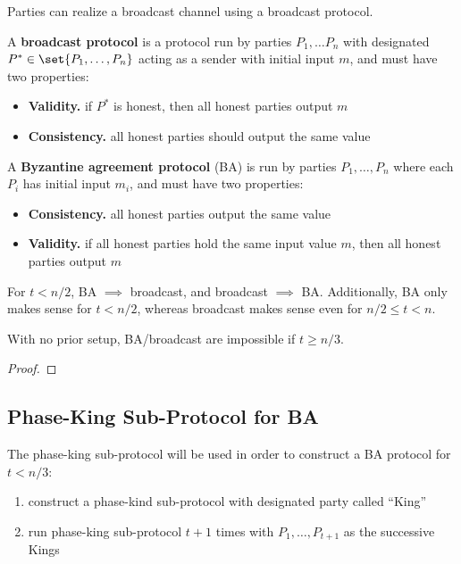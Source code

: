 
Parties can realize a broadcast channel using a broadcast protocol.

\begin{defn}
A \textbf{broadcast protocol} is a protocol run by parties $P_1, \dots  P_n$ with designated $P^* \in \set{P_1, \dots, P_n}$ acting as a sender with initial input $m$, and must have two properties:
\begin{itemize}
\item \textbf{Validity.} if $P^*$ is honest, then all honest parties output $m$
\item \textbf{Consistency.} all honest parties should output the same value
\end{itemize}
\end{defn}

\begin{defn}
A \textbf{Byzantine agreement protocol} (BA) is run by parties $P_1, \dots, P_n$ where each $P_i$ has initial input $m_i$, and must have two properties:
\begin{itemize}
\item \textbf{Consistency.} all honest parties output the same value 
\item \textbf{Validity.} if all honest parties hold the same input value $m$, then all honest parties output $m$
\end{itemize}
\end{defn}

For $t < n/2$, BA $\implies$ broadcast, and broadcast $\implies$ BA.
Additionally, BA only makes sense for $t < n/2$, whereas broadcast makes sense even for $n/2 \leq t < n$.

\begin{lem}
With no prior setup, BA/broadcast are impossible if $t \geq n/3$.
\end{lem}
\begin{proof}
\end{proof}

\subsection{Phase-King Sub-Protocol for BA}

The phase-king sub-protocol will be used in order to construct a BA protocol for $t < n/3$:
\begin{enumerate}
\item construct a phase-kind sub-protocol with designated party called ``King''
\item run phase-king sub-protocol $t + 1$ times with $P_1, \dots, P_{t+1}$ as the successive Kings
\end{enumerate}

